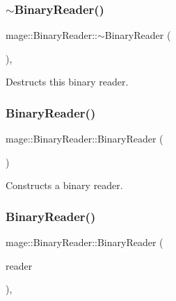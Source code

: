 \subsubsection{\texorpdfstring{$\sim$\+Binary\+Reader()}{~BinaryReader()}}
{\footnotesize\ttfamily mage\+::\+Binary\+Reader\+::$\sim$\+Binary\+Reader (\begin{DoxyParamCaption}{ }\end{DoxyParamCaption})\hspace{0.3cm}{\ttfamily [virtual]}, {\ttfamily [default]}}

Destructs this binary reader. \hypertarget{classmage_1_1_binary_reader_aab82579cef4f2f022273cf1adfcc8497}{}\label{classmage_1_1_binary_reader_aab82579cef4f2f022273cf1adfcc8497} 
\subsubsection{\texorpdfstring{Binary\+Reader()}{BinaryReader()}\hspace{0.1cm}{\footnotesize\ttfamily [1/3]}}
{\footnotesize\ttfamily mage\+::\+Binary\+Reader\+::\+Binary\+Reader (\begin{DoxyParamCaption}{ }\end{DoxyParamCaption})\hspace{0.3cm}{\ttfamily [protected]}}

Constructs a binary reader. \hypertarget{classmage_1_1_binary_reader_a8c1ff948f1d056439f3d8cc37d7f507c}{}\label{classmage_1_1_binary_reader_a8c1ff948f1d056439f3d8cc37d7f507c} 
\subsubsection{\texorpdfstring{Binary\+Reader()}{BinaryReader()}\hspace{0.1cm}{\footnotesize\ttfamily [2/3]}}
{\footnotesize\ttfamily mage\+::\+Binary\+Reader\+::\+Binary\+Reader (\begin{DoxyParamCaption}\item[{const \hyperlink{classmage_1_1_binary_reader}{Binary\+Reader} \&}]{reader }\end{DoxyParamCaption})\hspace{0.3cm}{\ttfamily [protected]}, {\ttfamily [delete]}}

